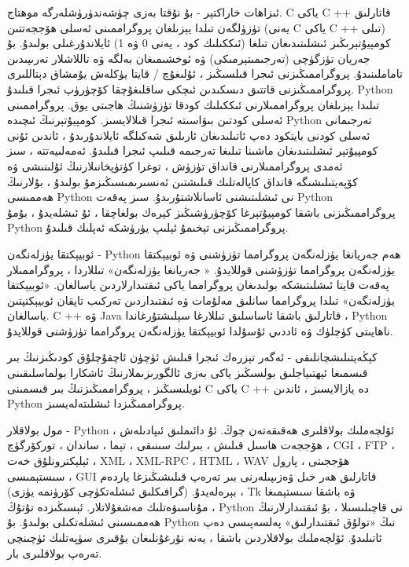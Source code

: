 \par
 ئىزاھات خاراكتېر - بۇ نۇقتا بەزى چۈشەندۈرۈشلەرگە موھتاج. C ياكى C ++ قاتارلىق تۈزۈلگەن تىلدا يېزىلغان پروگراممىنى ئەسلى ھۆججەتتىن (يەنى C ياكى C ++ تىلى) كومپيۇتېرىڭىز ئىشلىتىدىغان تىلغا (ئىككىلىك كود ، يەنى 0 ۋە 1) ئايلاندۇرغىلى بولىدۇ. بۇ جەريان تۈزگۈچى (تەرجىمىتېرمىكى) ۋە ئوخشىمىغان بەلگە ۋە تاللاشلار تەرىپىدىن تاماملىنىدۇ. پروگراممىڭىزنى ئىجرا قىلسىڭىز ، ئۇلىغۇچ / قايتا يۈكلەش يۇمشاق دېتاللىرى پروگراممىڭىزنى قاتتىق دىسكىدىن ئىچكى ساقلىغۇچقا كۆچۈرۈپ ئىجرا قىلىدۇ. Python تىلىدا يېزىلغان پروگراممىلارنى ئىككىلىك كودقا تۈزۈشنىڭ ھاجىتى يوق. پروگراممىنى ئەسلى كودتىن بىۋاسىتە ئىجرا قىلالايسىز. كومپيۇتېرنىڭ ئىچىدە Python تەرجىمانى ئەسلى كودنى بايتكود دەپ ئاتىلىدىغان ئارىلىق شەكىلگە ئايلاندۇرىدۇ ، ئاندىن ئۇنى كومپيۇتېر ئىشلىتىدىغان ماشىنا تىلىغا تەرجىمە قىلىپ ئىجرا قىلىدۇ. ئەمەلىيەتتە ، سىز ئەمدى پروگراممىلارنى قانداق تۈزۈش ، توغرا كۈتۈپخانىلارنىڭ ئۇلىنىشى ۋە كۆپەيتىلىشىگە قانداق كاپالەتلىك قىلىشتىن ئەنسىرىمىسىڭىزمۇ بولىدۇ ، بۇلارنىڭ ھەممىسى Python نى ئىشلىتىشنى ئاسانلاشتۇرىدۇ. سىز پەقەت Python پروگراممىڭىزنى باشقا كومپيۇتېرغا كۆچۈرۈشىڭىز كېرەك بولغاچقا ، ئۇ ئىشلەيدۇ ، بۇمۇ Python پروگراممىڭىزنى تېخىمۇ ئېلىپ يۈرۈشكە ئەپلىك قىلىدۇ.
\par
 ئوبيېكتقا يۈزلەنگەن - Python ھەم جەريانغا يۈزلەنگەن پروگرامما تۈزۈشنى ۋە ئوبيېكتقا يۈزلەنگەن پروگرامما تۈزۈشنى قوللايدۇ. « جەريانغا يۈزلەنگەن» تىللاردا ، پروگراممىلار پەقەت قايتا ئىشلىتىشكە بولىدىغان پروگرامما ياكى ئىقتىدارلاردىن ياسالغان. «ئوبيېكتقا يۈزلەنگەن» تىلدا پروگرامما سانلىق مەلۇمات ۋە ئىقتىداردىن تەركىب تاپقان ئوبيېكتپتىن ياسالغان. C ++ ۋە Java قاتارلىق باشقا ئاساسلىق تىللارغا سېلىشتۇرغاندا ، Python ناھايىتى كۈچلۈك ۋە ئاددىي ئۇسۇلدا ئوبيېكتقا يۈزلەنگەن پروگرامما تۈزۈشنى قوللايدۇ.
\par
 كېڭەيتىلىشچانلىقى - ئەگەر تېزرەك ئىجرا قىلىش ئۈچۈن ئاچقۇچلۇق كودىڭىزنىڭ بىر قىسمىغا ئېھتىياجلىق بولسىڭىز ياكى بەزى ئالگورىزىملارنىڭ ئاشكارا بولماسلىقىنى ئويلىسىڭىز ، پروگراممىڭىزنىڭ بىر قىسمىنى C ياكى C ++ دە يازالايسىز ، ئاندىن Python پروگراممىڭىزدا ئىشلىتەلەيسىز.
\par
 مول بولاقلار - Python ئۆلچەملىك بولاقلىرى ھەقىقەتەن چوڭ. ئۇ دائىملىق ئىپادىلەش ، ھۆججەت ھاسىل قىلىش ، بىرلىك سىنىقى ، تېما ، ساندان ، توركۆرگۈچ ، CGI ، FTP ، ئېلېكترونلۇق خەت ، XML ، XML-RPC ، HTML ، WAV ھۆججىتى ، پارول سىستېمىسى ، GUI قاتارلىق ھەر خىل ۋەزىپىلەرنى بىر تەرەپ قىلىشىڭىزغا ياردەم بېرەلەيدۇ. (گرافىكلىق ئىشلەتكۈچى كۆرۈنمە يۈزى) ، Tk ۋە باشقا سىستېمىغا مۇناسىۋەتلىك مەشغۇلاتلار. ئېسىڭىزدە تۇتۇڭ ، Python نى قاچىلىسىلا ، بۇ ئىقتىدارلارنىڭ ھەممىسىنى ئىشلەتكىلى بولىدۇ. بۇ Python نىڭ «تولۇق ئىقتىدارلىق» پەلسەپىسى دەپ ئاتىلىدۇ. ئۆلچەملىك بولاقلاردىن باشقا ، يەنە نۇرغۇنلىغان يۇقىرى سۈپەتلىك ئۈچىنچى تەرەپ بولاقلىرى بار.


